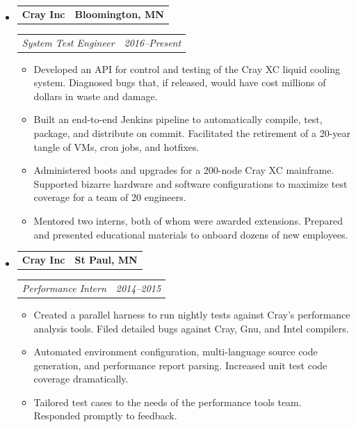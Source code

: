 \documentclass[11pt,letterpaper]{article}
\makeatletter
\newcommand{\headerrow}[2]{
    \begin{tabular*}{\linewidth}{l@{ \extracolsep{\fill} }r} #1 & #2
    \end{tabular*}
}
\newcommand{\YearRange}[2]{#1--#2}
\makeatother
\begin{document}
\begin{itemize}[leftmargin=\parindent]
    \parskip=0.1em
    \itemsep=1.5em

    \item[]
        \headerrow{ \textbf{Cray Inc} }{ \textbf{Bloomington, MN} }
        \headerrow
            { \emph{System Test Engineer} }
            { \emph{ \YearRange{2016}{Present} } }
        \begin{itemize}
            \item Developed an API for control and testing of the Cray XC liquid cooling system. Diagnosed bugs that, if released, would have cost millions of dollars in waste and damage.
            \item Built an end-to-end Jenkins pipeline to automatically compile, test, package, and distribute on commit. Facilitated the retirement of a 20-year tangle of VMs, cron jobs, and hotfixes.
            \item Administered boots and upgrades for a 200-node Cray XC mainframe. Supported bizarre hardware and software configurations to maximize test coverage for a team of 20 engineers.
            \item Mentored two interns, both of whom were awarded extensions. Prepared and presented educational materials to onboard dozens of new employees.
        \end{itemize}

    \item[]
        \headerrow{ \textbf{Cray Inc} }{ \textbf{St Paul, MN} }
        \headerrow
            { \emph{Performance Intern} }
            { \emph{ \YearRange{2014}{2015} } }
        \begin{itemize}
            \item Created a parallel harness to run nightly tests against Cray's performance analysis tools. Filed detailed bugs against Cray, Gnu, and Intel compilers.
            \item Automated environment configuration, multi-language source code generation, and performance report parsing. Increased unit test code coverage dramatically.
            \item Tailored test cases to the needs of the performance tools team. Responded promptly to feedback.
        \end{itemize}


\end{itemize}
\end{document}

